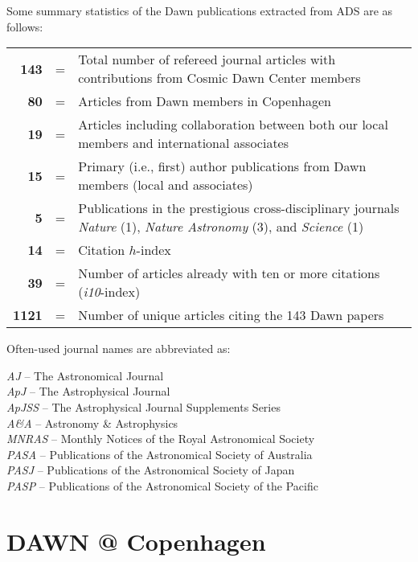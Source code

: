 \documentclass{article}
\begin{document}
Some summary statistics of the Dawn publications extracted from ADS are as follows: 

\newcommand\tsep{=}

\hspace{0.5cm}\begin{tabularx}{\textwidth}{ r p{0.1cm} l }
    
\textbf{143} & \tsep &  Total number of refereed journal articles with contributions from Cosmic Dawn Center members \\
\textbf{80} & \tsep &  Articles from Dawn members in Copenhagen \\
\textbf{19} & \tsep &  Articles including collaboration between both our local members and international associates \\
\textbf{15} & \tsep &  Primary (i.e., first) author publications from Dawn members (local and associates) \\
\textbf{5} & \tsep &  Publications in the prestigious cross-disciplinary journals \textit{Nature} (1), \textit{Nature Astronomy} (3), and \textit{Science} (1) \\
 \textbf{14} & \tsep & Citation $h$-index \\
 \textbf{39} & \tsep & Number of articles already with ten or more citations (\textit{i10}-index) \\
 \textbf{1121} & \tsep & Number of unique articles citing the 143 Dawn papers \\

\end{tabularx}


Often-used journal names are abbreviated as: 

\textit{AJ} -- The Astronomical Journal\\
\textit{ApJ} -- The Astrophysical Journal\\ 
\textit{ApJSS} -- The Astrophysical Journal Supplements Series\\ 
\textit{A\&A} -- Astronomy \& Astrophysics\\ 
\textit{MNRAS} -- Monthly Notices of the Royal Astronomical Society\\ 
\textit{PASA} -- Publications of the Astronomical Society of Australia\\ 
\textit{PASJ} -- Publications of the Astronomical Society of Japan\\ 
\textit{PASP} -- Publications of the Astronomical Society of the Pacific


\section*{DAWN @ Copenhagen}

%


\end{document}
